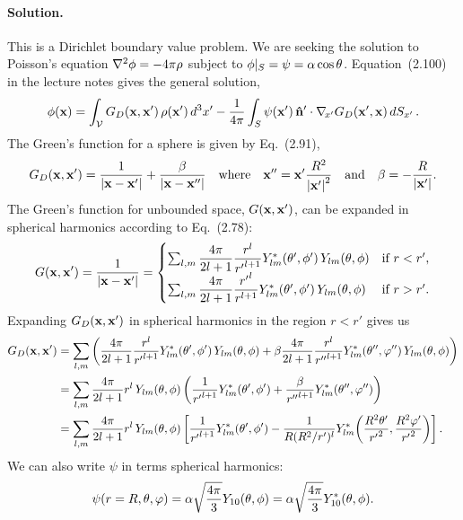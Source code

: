 \documentclass[11pt]{article}
\newcommand{\beq}{\begin{equation*}}
\newcommand{\eeq}{\end{equation*}}
\newcommand{\beqn}{\begin{equation}}
\newcommand{\eeqn}{\end{equation}}
\newenvironment{solution}
{
    \paragraph{Solution.}
    \ignorespaces
}
{
    \bigskip
}
\begin{document}
\begin{solution}
	This is a Dirichlet boundary value problem.  We are seeking the solution to Poisson's equation $\nabla^2\phi = -4\pi\rho$ subject to $\phi|_S = \psi = \alpha \cos\theta$.  Equation~(2.100) in the lecture notes gives the general solution,
	\beqn \label{sol3}
		\phix = \intV \Gdxxp \, \rhoxp \dcxp - \frac{1}{4\pi} \intS \psixp \, \nh' \cdot \nabxp \Gdxpx \dSxp.
	\eeqn
	The Green's function for a sphere is given by Eq.~(2.91),
	\beq
		\Gdxxp = \frac{1}{\abs{\vx - \vx'}} + \frac{\beta}{\abs{\vx - \vx''}} \qq{where} \vx'' = \vx' \frac{R^2}{\absxp^2} \qand \beta = - \frac{R}{\absxp}.
	\eeq
	The Green's function for unbounded space, $G(\mathbf{x}, \mathbf{x}')$, can be expanded in spherical harmonics according to Eq.~(2.78):
	\beq
		\Gxxp = \frac{1}{\abs{\vx - \vx'}}
		= \begin{cases} \sum_{l,m} \dfrac{4\pi}{2l + 1} \dfrac{r^l}{{r'}^{l + 1}} \Ylm^*\tvp \, \Ylm\tv & \text{if } r < r', \\
		\sum_{l,m} \dfrac{4\pi}{2l + 1} \dfrac{{r'}^l}{r^{l + 1}} \Ylm^*\tvp \, \Ylm\tv & \text{if } r > r'. \end{cases}
	\eeq
	Expanding $G_D(\mathbf{x}, \mathbf{x}')$ in spherical harmonics in the region $r < r'$ gives us
	\begin{align*}
		G_D(\mathbf{x}, \mathbf{x}') &= \sum_{l,m} \left( \frac{4\pi}{2l + 1} \frac{r^l}{{r'}^{l + 1}} Y_{l m}^*(\theta', \phi') \, Y_{l m}(\theta, \phi) + \beta \frac{4\pi}{2l + 1} \frac{r^l}{{r''}^{l + 1}} Y_{l m}^*(\theta'', \varphi'') \, Y_{l m}(\theta, \phi) \right) \\
		&= \sum_{l,m} \frac{4\pi}{2l + 1} r^l \, Y_{l m}(\theta, \phi) \left( \frac{1}{{r'}^{l + 1}} Y_{l m}^*(\theta', \phi') + \frac{\beta}{{r''}^{l + 1}} Y_{l m}^*(\theta'', \varphi'') \right) \\
		&= \sum_{l,m} \frac{4\pi}{2l + 1} r^l \, Y_{l m}(\theta, \phi) \left[ \frac{1}{{r'}^{l + 1}} Y_{l m}^*(\theta', \phi') - \frac{1}{R (R^2 / r')^l} Y_{l m}^*\!\left( \frac{R^2 \theta'}{{r'}^2}, \frac{R^2 \varphi'}{{r'}^2} \right) \right].
	\end{align*}
	We can also write $\psi$ in terms spherical harmonics:
	\beq
		\psi(r=R, \tht, \vph) = \alp \sqfr{4\pi}{3} Y_{1 0}\tv = \alp \sqfr{4\pi}{3} Y_{1 0}^*\tv.
	\eeq
	

\end{solution}
\end{document}
